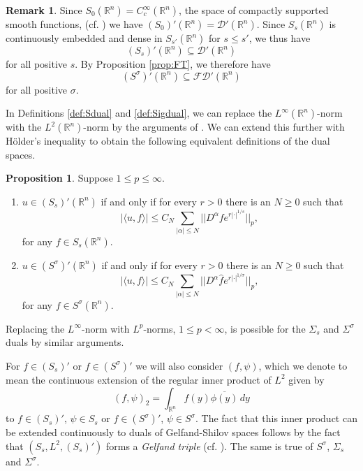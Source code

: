 \documentclass[11pt,a4paper,reqno]{amsart}
\numberwithin{equation}{section}
\theoremstyle{definition}
\newtheorem{prop}[thm]{Proposition}
\theoremstyle{definition}
\newtheorem{remark}[thm]{Remark}
\begin{document}
\begin{remark}
Since $S_0(\mathbb{R}^n) = C_c^\infty(\mathbb{R}^n)$, the space of compactly supported smooth functions, (cf. \cite[p.~170]{gel}) we have $(S_0)'(\mathbb{R}^n) = \mathscr{D}'(\mathbb{R}^n)$. Since $S_s(\mathbb{R}^n)$ is continuously embedded and dense in $S_{s'}(\mathbb{R}^n)$ for $s\leq s'$, we thus have $$(S_s)'(\mathbb{R}^n) \subseteq \mathscr{D}'(\mathbb{R}^n)$$ for all positive $s$. By Proposition \ref{prop:FT}, we therefore have $$(S^\sigma)'(\mathbb{R}^n) \subseteq \mathscr{F}\mathscr{D}'(\mathbb{R}^n)$$
for all positive $\sigma$.
\end{remark}
In Definitions \ref{def:Sdual} and \ref{def:Sigdual}, we can replace the $L^\infty(\mathbb{R}^n)$-norm with the $L^2(\mathbb{R}^n)$-norm by the arguments of \cite[p.~134]{eijndhoven}. We can extend this further with Hölder's inequality to obtain the following equivalent definitions of the dual spaces.
\begin{prop}\label{prop:Ssdual}
 Suppose $1\leq p \leq \infty$.
\begin{enumerate}[label=(\roman*)]
    \item $u\in (S_s)'(\mathbb{R}^n)$ if and only if for every $r>0$ there is an $N\geq 0$ such that
    \begin{equation*}
        |\langle u, f \rangle | \leq C_N \sum_{|\alpha|\leq N} || D^\alpha f e^{r|\cdot|^{1/s}} ||_p,
    \end{equation*}
    for any $f\in S_s(\mathbb{R}^n)$.
     \item $u\in (S^\sigma)'(\mathbb{R}^n)$ if and only if for every $r>0$ there is an $N\geq 0$ such that
    \begin{equation*}
        |\langle u, f \rangle | \leq C_N \sum_{|\alpha|\leq N} || D^\alpha \hat{f} e^{r|\cdot|^{1/\sigma}} ||_p,
    \end{equation*}
    for any $f\in S^\sigma(\mathbb{R}^n)$.
\end{enumerate}
\end{prop}
Replacing the $L^\infty$-norm with $L^p$-norms, $1\leq p < \infty$, is possible for the $\Sigma_s$ and $\Sigma^\sigma$ duals by similar arguments.

For $f\in (S_s)'$ or $f\in (S^\sigma)'$ we will also consider
$(f,\psi)$, which we denote to mean the continuous extension of the regular inner product of $L^2$ given by
\begin{equation*}
    (f,\psi)_2 = \int_{\mathbb{R}^n} f(y) \overline{\phi(y)} \, d y
\end{equation*}
to $f\in(S_s)'$, $\psi\in S_s$ or $f\in(S^\sigma)'$, $\psi\in S^\sigma$. The fact that this inner product can be extended continuously to duals of Gelfand-Shilov spaces follows by the fact that $(S_s,L^2,(S_s)')$ forms a \emph{Gelfand triple} (cf. \cite{bannert}). The same is true of $S^\sigma$, $\Sigma_s$ and $\Sigma^\sigma$.
\end{document}
